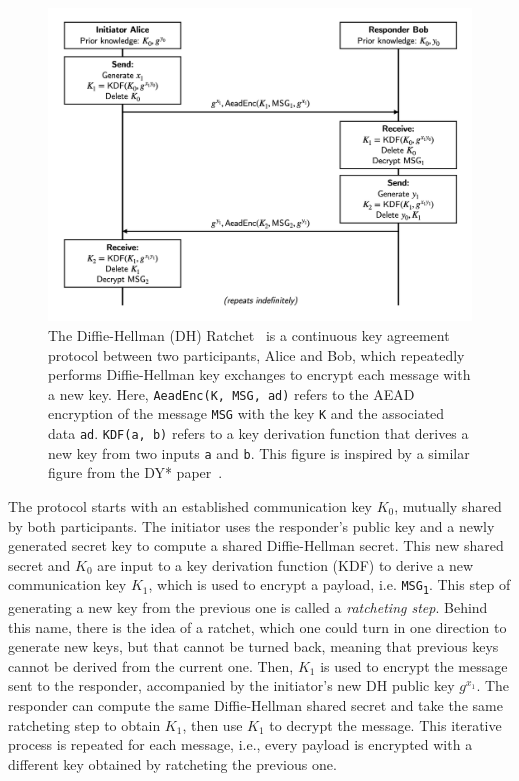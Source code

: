 \begin{figure}
    \centering
    \includegraphics[width=1.0\textwidth]{figures/DH-ratchet.png}
    \caption{The Diffie-Hellman (DH) Ratchet~\cite{perrin2016double} is a continuous key agreement protocol between two participants, Alice and Bob, which repeatedly performs Diffie-Hellman key exchanges to encrypt each message with a new key.
    Here, \texttt{AeadEnc(K, MSG, ad)} refers to the AEAD encryption of the message \texttt{MSG} with the key \texttt{K} and the associated data \texttt{ad}. \texttt{KDF(a, b)} refers to a key derivation function that derives a new key from two inputs \texttt{a} and \texttt{b}.
    This figure is inspired by a similar figure from the DY* paper~\cite{bhargavan2021text}.}
    \label{fig:dh-ratchet}
\end{figure}

The protocol starts with an established communication key $K_0$, mutually shared by both participants.
The initiator uses the responder's public key and a newly generated secret key to compute a shared Diffie-Hellman secret.
This new shared secret and $K_0$ are input to a key derivation function (KDF) to derive a new communication key $K_1$, which is used to encrypt a payload, i.e. \texttt{MSG\textsubscript{1}}.
This step of generating a new key from the previous one is called a \emph{ratcheting step}.
Behind this name, there is the idea of a ratchet, which one could turn in one direction to generate new keys, but that cannot be turned back, meaning that previous keys cannot be derived from the current one.
Then, $K_1$ is used to encrypt the message sent to the responder, accompanied by the initiator's new DH public key $g^{x_1}$.
The responder can compute the same Diffie-Hellman shared secret and take the same ratcheting step to obtain $K_1$, then use $K_1$ to decrypt the message.
This iterative process is repeated for each message, i.e., every payload is encrypted with a different key obtained by ratcheting the previous one.

